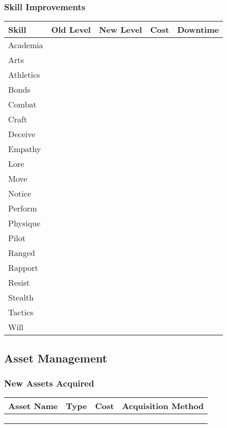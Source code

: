 \subsubsection{Skill Improvements}
\begin{tabular}{|p{4cm}|c|c|c|c|}
\hline
\textbf{Skill} & \textbf{Old Level} & \textbf{New Level} & \textbf{Cost} & \textbf{Downtime} \\
\hline
Academia & & & & \\
Arts & & & & \\
Athletics & & & & \\
Bonds & & & & \\
Combat & & & & \\
Craft & & & & \\
Deceive & & & & \\
Empathy & & & & \\
Lore & & & & \\
Move & & & & \\
Notice & & & & \\
Perform & & & & \\
Physique & & & & \\
Pilot & & & & \\
Ranged & & & & \\
Rapport & & & & \\
Resist & & & & \\
Stealth & & & & \\
Tactics & & & & \\
Will & & & & \\
\hline
\end{tabular}

\subsection{Asset Management}

\subsubsection{New Assets Acquired}
\begin{tabular}{|p{3cm}|p{2cm}|p{2cm}|p{3cm}|}
\hline
\textbf{Asset Name} & \textbf{Type} & \textbf{Cost} & \textbf{Acquisition Method} \\
\hline
& & & \\
& & & \\
& & & \\
\hline
\end{tabular}


